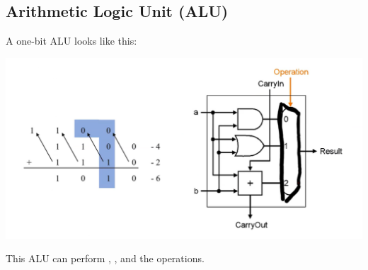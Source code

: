 \documentclass[letterpaper]{article}
\begin{document}
\subsection{Arithmetic Logic Unit (ALU)}
A one-bit ALU looks like this:
\begin{center}
    \includegraphics[scale=0.5]{1b_alu.PNG}
\end{center}
This ALU can perform , , and the  operations. 
\end{document}
